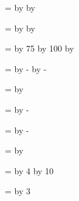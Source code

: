 \T=\ODDSIDEMARGIN
\advance\T by \TEXTWIDTH
\advance\T by \EVENSIDEMARGIN
\xdef\INNERWIDTH{\the\T}  %

\T=\ODDSIDEMARGIN
\advance\T by \TEXTWIDTH
\advance\T by \MARGINPARSEP
\xdef\MARGINNOTEXORIGIN{\the\T} %

\T=\TEXTHEIGHT
\multiply\T by 75
\divide\T by 100
\advance\T by \FOOTSKIP
\xdef\MARGINNOTEYA{\the\T}      %

\T=\MARGINNOTEYA
\advance\T by -\MARGINNOTEHEIGHT
\advance\T by -\MARGINPARPUSH
\xdef\MARGINNOTEYB{\the\T}      %

\T=\MARGINNOTEYA
\advance\T by \MARGINNOTEHEIGHT
\xdef\MARGINNOTEYC{\the\T}      %

\T=\PAGEHEIGHT
\advance\T by -\DVIYOFFSET
\xdef\PAGEYTOP{\the\T}          %

\T=\PAGEYTOP
\advance\T by -\INNERHEIGHT
\xdef\PAGEYORIGIN{\the\T}       %

\T=\ODDSIDEMARGIN
\advance\T by \TEXTWIDTH
\xdef\RIGHTEDGE{\the\T}         %

\T=\TEXTHEIGHT
\multiply\T by 4
\divide\T by 10
\xdef\TEXTY{\the\T}             %

\T=\TEXTHEIGHT
\divide\T by 3
\xdef\TEXTWIDTHY{\the\T}        %

